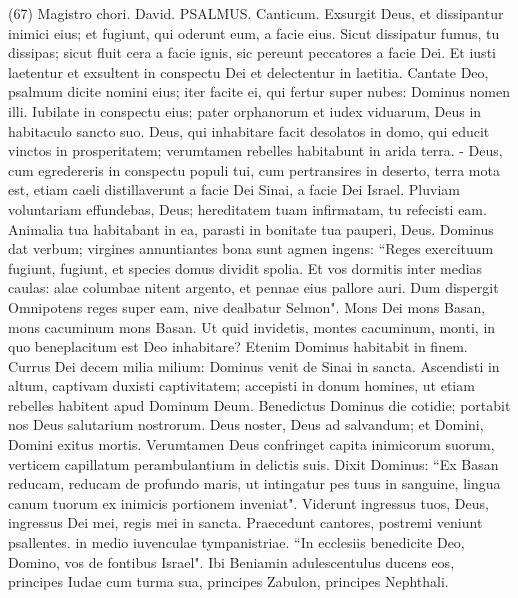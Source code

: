 \begin{biblechapter}  (67) 
\verse  Magistro chori. David. PSALMUS. Canticum. 
\verse Exsurgit Deus, et dissipantur inimici eius; et fugiunt, qui oderunt eum, a facie eius. 
\verse Sicut dissipatur fumus, tu dissipas; sicut fluit cera a facie ignis, sic pereunt peccatores a facie Dei. 
\verse Et iusti laetentur et exsultent in conspectu Dei et delectentur in laetitia. 
\verse Cantate Deo, psalmum dicite nomini eius; iter facite ei, qui fertur super nubes: Dominus nomen illi. Iubilate in conspectu eius; 
\verse pater orphanorum et iudex viduarum, Deus in habitaculo sancto suo. 
\verse Deus, qui inhabitare facit desolatos in domo, qui educit vinctos in prosperitatem; verumtamen rebelles habitabunt in arida terra. - 
\verse Deus, cum egredereris in conspectu populi tui, cum pertransires in deserto, 
\verse terra mota est, etiam caeli distillaverunt a facie Dei Sinai, a facie Dei Israel. 
\verse Pluviam voluntariam effundebas, Deus; hereditatem tuam infirmatam, tu refecisti eam. 
\verse Animalia tua habitabant in ea, parasti in bonitate tua pauperi, Deus. 
\verse Dominus dat verbum; virgines annuntiantes bona sunt agmen ingens: 
\verse “Reges exercituum fugiunt, fugiunt, et species domus dividit spolia. 
\verse Et vos dormitis inter medias caulas: alae columbae nitent argento, et pennae eius pallore auri. 
\verse Dum dispergit Omnipotens reges super eam, nive dealbatur Selmon". 
\verse Mons Dei mons Basan, mons cacuminum mons Basan. 
\verse Ut quid invidetis, montes cacuminum, monti, in quo beneplacitum est Deo inhabitare? Etenim Dominus habitabit in finem. 
\verse Currus Dei decem milia milium: Dominus venit de Sinai in sancta. 
\verse Ascendisti in altum, captivam duxisti captivitatem; accepisti in donum homines, ut etiam rebelles habitent apud Dominum Deum. 
\verse Benedictus Dominus die cotidie; portabit nos Deus salutarium nostrorum. 
\verse Deus noster, Deus ad salvandum; et Domini, Domini exitus mortis. 
\verse Verumtamen Deus confringet capita inimicorum suorum, verticem capillatum perambulantium in delictis suis. 
\verse Dixit Dominus: “Ex Basan reducam, reducam de profundo maris, 
\verse ut intingatur pes tuus in sanguine, lingua canum tuorum ex inimicis portionem inveniat". 
\verse Viderunt ingressus tuos, Deus, ingressus Dei mei, regis mei in sancta. 
\verse Praecedunt cantores, postremi veniunt psallentes. in medio iuvenculae tympanistriae. 
\verse “In ecclesiis benedicite Deo, Domino, vos de fontibus Israel". 
\verse Ibi Beniamin adulescentulus ducens eos, principes Iudae cum turma sua, principes Zabulon, principes Nephthali. 

\end{biblechapter}
